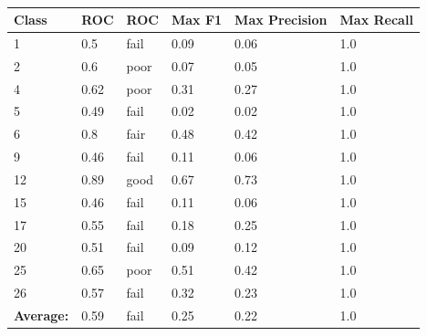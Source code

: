     \begin{table}[!h]
    \centering
    {\small
    \begin{tabular}{llllll}
    \hline
    \textbf{Class}    & \textbf{ROC} & \textbf{ROC} & \textbf{Max F1} & \textbf{Max Precision} & \textbf{Max Recall} \\ \hline
    1                 & 0.5          & fail         & 0.09            & 0.06                   & 1.0                 \\
    2                 & 0.6          & poor         & 0.07            & 0.05                   & 1.0                 \\
    4                 & 0.62         & poor         & 0.31            & 0.27                   & 1.0                 \\
    5                 & 0.49         & fail         & 0.02            & 0.02                   & 1.0                 \\
    6                 & 0.8          & fair         & 0.48            & 0.42                   & 1.0                 \\
    9                 & 0.46         & fail         & 0.11            & 0.06                   & 1.0                 \\
    12                & 0.89         & good         & 0.67            & 0.73                   & 1.0                 \\
    15                & 0.46         & fail         & 0.11            & 0.06                   & 1.0                 \\
    17                & 0.55         & fail         & 0.18            & 0.25                   & 1.0                 \\
    20                & 0.51         & fail         & 0.09            & 0.12                   & 1.0                 \\
    25                & 0.65         & poor         & 0.51            & 0.42                   & 1.0                 \\
    26                & 0.57         & fail         & 0.32            & 0.23                   & 1.0                 \\ \hline
    \textbf{Average:} & 0.59         & fail         & 0.25            & 0.22                   & 1.0                 \\ \hline
    \end{tabular} }
    \caption{}
    \label{my-label}
    \end{table}


